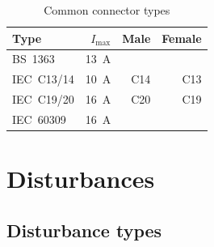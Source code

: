 \documentclass{pgslides}
\begin{document}

\begin{frame}{\insertsubsectionhead}
\begin{table}[htbp]
  \centering  
  \begin{tabular}{l r r r}
    \toprule
    \textbf{Type} & $I_{\mbox{max}}$ & \textbf{Male} & \textbf{Female} \\
    \midrule
    BS~1363 & \SI{13}{\ampere} & ~ & ~ \\
    \midrule
    IEC~C13/14 & \SI{10}{\ampere} & C14 & C13 \\
    \midrule  
    IEC~C19/20 & \SI{16}{\ampere} & C20 & C19 \\
    \midrule  
    IEC~60309 & \SI{16}{\ampere} & ~ & ~ \\
    \bottomrule
  \end{tabular}
  \caption{Common connector types}
  \label{tab:common-mains-plugs-sockets}
\end{table}
\end{frame}

\section{Disturbances}


\subsection{Disturbance types}
\end{document}
